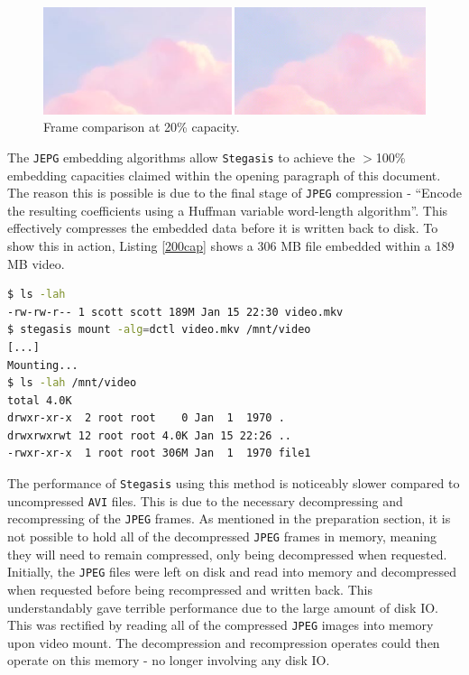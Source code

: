 \documentclass[paper=a4, fontsize=11pt,twoside]{scrartcl}
\numberwithin{table}{section}
\numberwithin{figure}{section}
\numberwithin{algorithm}{section}
\begin{document}
\begin{figure}[!h]
\centerline{\includegraphics[width=\textwidth]{images/bb_20cap.png}}
\caption{Frame comparison at 20\% capacity.}
\label{jpegnoart}
\end{figure}

\noindent
The \texttt{JEPG} embedding algorithms allow \texttt{Stegasis} to achieve the $>$100\% embedding capacities claimed within the opening paragraph of this document. The reason this is possible is due to the final stage of \texttt{JPEG} compression - ``Encode the resulting coefficients using a Huffman variable word-length algorithm''. This effectively compresses the embedded data before it is written back to disk. To show this in action, Listing \ref{200cap} shows a 306 MB file embedded within a 189 MB video.

\begin{lstlisting}[language=bash,caption={Demonstration of 162\% embedding capacity.}, frame=single, label=200cap]
$ ls -lah
-rw-rw-r-- 1 scott scott 189M Jan 15 22:30 video.mkv
$ stegasis mount -alg=dctl video.mkv /mnt/video
[...]
Mounting...
$ ls -lah /mnt/video
total 4.0K
drwxr-xr-x  2 root root    0 Jan  1  1970 .
drwxrwxrwt 12 root root 4.0K Jan 15 22:26 ..
-rwxr-xr-x  1 root root 306M Jan  1  1970 file1
\end{lstlisting}

The performance of \texttt{Stegasis} using this method is noticeably slower compared to uncompressed \texttt{AVI} files. This is due to the necessary decompressing and recompressing of the \texttt{JPEG} frames. As mentioned in the preparation section, it is not possible to hold all of the decompressed \texttt{JPEG} frames in memory, meaning they will need to remain compressed, only being decompressed when requested. Initially, the \texttt{JPEG} files were left on disk and read into memory and decompressed when requested before being recompressed and written back. This understandably gave terrible performance due to the large amount of disk IO. This was rectified by reading all of the compressed \texttt{JPEG} images into memory upon video mount. The decompression and recompression operates could then operate on this memory - no longer involving any disk IO.\\
\end{document}
